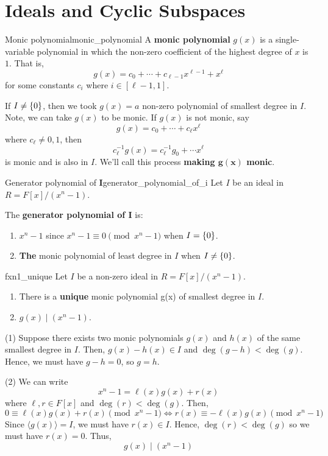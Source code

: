 \section{Ideals and Cyclic Subspaces}

\begin{Definition}{Monic polynomial}{monic_polynomial}
    A \textbf{monic polynomial} $ g(x) $ is a single-variable
    polynomial in which the non-zero coefficient of the highest degree of $ x $
    is $ 1 $. That is,
    \[ g(x)=c_0+\cdots+c_{\ell -1}x^{\ell -1}+ x^\ell \]
    for some constants $ c_i $ where $ i\in[\ell-1,1] $.
\end{Definition}

If $ I\neq \{0\} $, then we took $ g(x)=a $ non-zero
polynomial of smallest degree in $ I $. Note, we can
take $ g(x) $ to be monic. If $ g(x) $ is not monic, say
\[ g(x)=c_0+\cdots+c_\ell x^{\ell} \]
where $ c_\ell \neq 0, 1 $, then
\[ c_{\ell}^{-1}g(x)=c_\ell^{-1} g_0+\cdots x^\ell \]
is monic and is also in $ I $. We'll call this process
\textbf{making $ \symbf{g(x)} $ monic}.

\begin{Definition}{Generator polynomial of $ \symbf{I} $}{generator_polynomial_of_i}
    Let $ I $ be an ideal in $ R=F[x]/(x^n-1) $.

    The \textbf{generator polynomial of $ \symbf{I} $} is:
    \begin{enumerate}[label=(\arabic*)]
        \item $ x^n-1 $ since $ x^n-1\equiv 0 \pmod{x^n-1} $ when $ I=\{0\} $.
        \item \textbf{The}
              monic polynomial of least degree in $ I $ when $ I \neq \{0\} $.
    \end{enumerate}
\end{Definition}

\begin{Theorem}{}{fxn1_unique}
    Let $ I $ be a non-zero ideal in $ R=F[x]/(x^n-1) $.
    \begin{enumerate}[label=(\arabic*)]
        \item There is a \textbf{unique} monic polynomial
              g(x) of smallest degree in $ I $.
        \item $ g(x)\mid (x^n-1) $.
    \end{enumerate}
\end{Theorem}

\begin{Proof}{}{}
    (1) Suppose
    there exists two monic polynomials $ g(x) $ and $ h(x) $
    of the same smallest degree in $ I $.
    Then, $ g(x)-h(x)\in I $ and $ \deg(g-h)<\deg (g) $. Hence, we must
    have $ g-h=0 $, so $ g=h $.

    (2) We can write
    \[ x^n-1=\ell(x)g(x)+r(x) \]
    where $ \ell,r\in F[x] $ and $ \deg(r)<\deg(g) $. Then,
    \[ 0\equiv \ell (x)g(x)+r(x)\pmod{x^n-1}\iff r(x)\equiv -\ell(x)g(x)\pmod{x^n-1} \]
    Since $ \langle g(x)\rangle = I $, we must have $ r(x)\in I $.
    Hence, $ \deg(r)<\deg(g) $ so we must have $ r(x)=0 $. Thus,
    \[ g(x)\mid (x^n-1) \]
\end{Proof}

